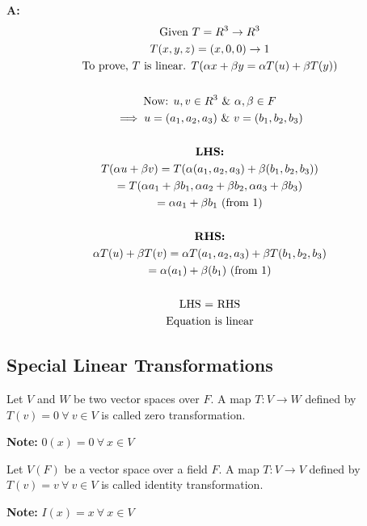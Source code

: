 \documentclass[english,course,fleqn]{lecture}
\newenvironment{qanda}{\setlength{\parindent}{0pt}}{\bigskip}
\newcommand{\A}{\par\textbf{A:} \normalfont}
\begin{document}
\begin{qanda}
	\A
	\begin{gather*}
		\text{Given } T = R^{3} \rightarrow R^{3}\\
		T(x,y,z) = (x,0,0) \rightarrow 1\\
		\text{To prove, $T$ is linear. $T(\alpha x + \beta y = \alpha T(u) + \beta T(y))$}\\
		\\
		\textrm{Now: } u,v \in R^{3} ~\&~ \alpha, \beta \in F\\
		\implies u = (a_{1}, a_{2}, a_{3}) ~\&~ v = (b_{1}, b_{2}, b_{3})\\
		\\
		\text{\textbf{LHS:}}\\
		T(\alpha u + \beta v) = T(\alpha (a_{1}, a_{2}, a_{3}) + \beta(b_{1}, b_{2}, b_{3}))\\
		= T(\alpha a_{1} + \beta b_{1}, \alpha a_{2} + \beta b_{2}, \alpha a_{3} + \beta b_{3})\\
		= \alpha a_{1} + \beta b_{1} \text{ (from 1)}\\
		\\
		\text{\textbf{RHS:}}\\
		\alpha T(u) + \beta T(v) = \alpha T(a_{1}, a_{2}, a_{3}) + \beta T(b_{1}, b_{2}, b_{3})\\
		= \alpha (a_{1}) + \beta (b_{1}) \text{ (from 1)}\\
		\\
		\text{LHS $=$ RHS}\\
		\text{Equation is linear}
	\end{gather*}
\end{qanda}

\newpage

\subsection{Special Linear Transformations}

\begin{definition}
	Let $V$ and $W$ be two vector spaces over $F$.
	A map $T:V\rightarrow W$ defined by $T(v) = 0 ~\forall~ v \in V$ is called zero transformation.

	\textbf{Note: } $0(x) = 0 ~\forall~ x \in V$
\end{definition}

\begin{definition}
	Let $V(F)$ be a vector space over a field $F$.
	A map $T:V\rightarrow V$ defined by $T(v) = v ~\forall~ v \in V$ is called identity transformation.

	\textbf{Note: }$I(x) = x ~\forall~ x \in V$
\end{definition}
\end{document}
